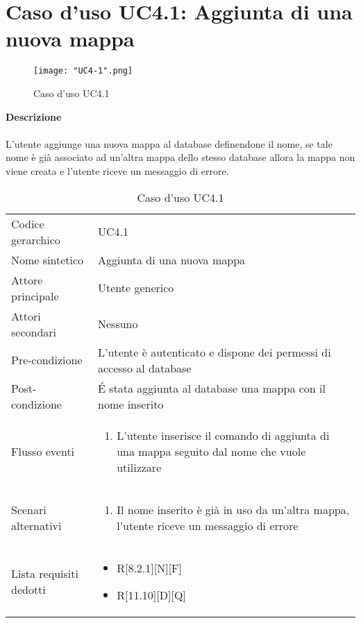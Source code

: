 \documentclass[a4paper]{report}
\begin{document}
	 \section{Caso d'uso UC4.1: Aggiunta di una nuova mappa}
	 \begin{figure}[H]
			\centering
			\texttt{[image: "UC4-1".png]}
			\caption{Caso d'uso UC4.1}
		\end{figure}
	 \textbf{Descrizione} \\ \\
	 L'utente aggiunge una nuova mappa al database definendone il nome, se tale nome è già associato ad 
	 un'altra mappa dello stesso database allora la mappa non viene creata e l'utente riceve un messaggio
	 di errore.
		\begin{table}[H]
		\begin{tabularx}{\textwidth}{X | X}\toprule
			\rowcolor{orange!65}Codice gerarchico & UC4.1 \\
			Nome sintetico & Aggiunta di una nuova mappa \\
			\rowcolor{orange!65}Attore principale & Utente generico\\
			Attori secondari & Nessuno \\
			\rowcolor{orange!65}Pre-condizione & L'utente è autenticato e dispone dei permessi di accesso
			al database\\
			Post-condizione & \'E stata aggiunta al database una mappa con il nome inserito\\
			\rowcolor{orange!65}Flusso eventi & \begin{enumerate}
			\item L'utente inserisce il comando di aggiunta di una mappa seguito dal nome che vuole utilizzare
			\end{enumerate} \\
			Scenari alternativi & \begin{enumerate}
			\item Il nome inserito è già in uso da un'altra mappa, l'utente riceve un messaggio di errore
			\end{enumerate} \\
			\rowcolor{orange!65}Lista requisiti dedotti & \begin{itemize}
				\item R[8.2.1][N][F]
				\item R[11.10][D][Q]
				\end{itemize} \\
			\bottomrule
		\end{tabularx}
		\caption{Caso d'uso UC4.1}
	 \end{table}
\end{document}
